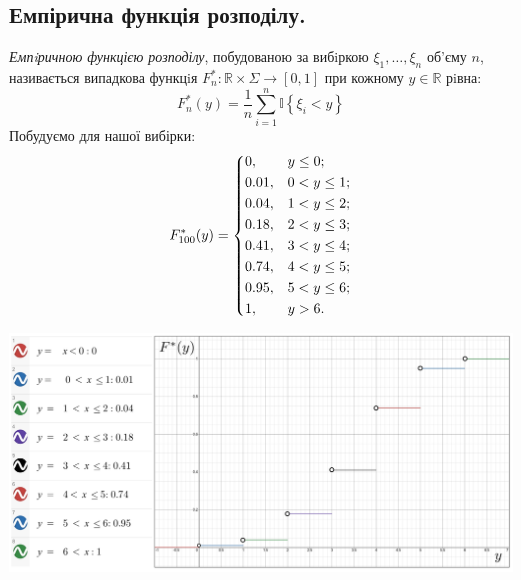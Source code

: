 \documentclass[14pt,a4paper]{scrartcl}
\theoremstyle{definition}
\theoremstyle{remark}
\theoremstyle{definition}
\theoremstyle{definition}
\def\index{\mathbb{I}}         %
\begin{document}
\subsection*{Емпірична функція розподілу.}
\textit{Емпiричною функцією розподілу}, побудованою за вибiркою $\xi_1, \dots , \xi_n$ об’єму $n$, називається випадкова
функцiя $F_n^* : \mathbb{R} \times \Sigma \to [0,1]$ при кожному $y \in \mathbb{R}$ рiвна:
$$
F_n^* (y) = \frac{1}{n}  \sum\limits_{i = 1}^{ n}{ \index \left\lbrace \xi_i < y \right\rbrace}
$$
Побудуємо для нашої вибірки:
\[
F_{100}^* (y)= \begin{dcases}
0, &y \leq 0;\\
0.01, & 0 < y \leq 1;\\
0.04, & 1 < y \leq 2;\\
0.18, & 2 < y \leq 3;\\
0.41, & 3 < y \leq 4;\\
0.74, & 4 < y \leq 5;\\
0.95, & 5 < y \leq 6;\\
1, &  y > 6.\\
\end{dcases}
\]
\begin{center}
 \includegraphics[scale=0.305]{assets/РР_126_Терещенко-7c0395e9.png}
\end{center}
\newpage
\end{document}
